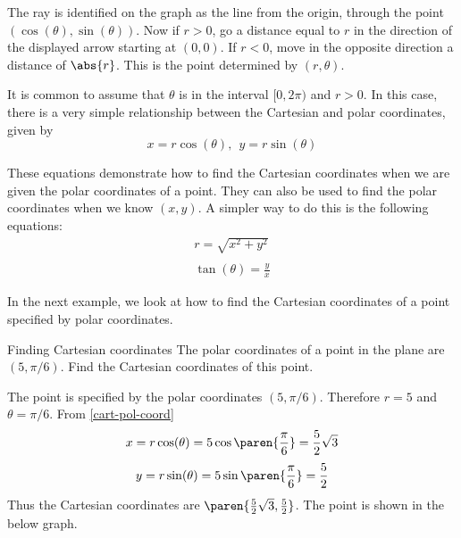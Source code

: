 The ray is identified on the graph as the line from the origin, through the point $(\cos(\theta),\sin(\theta))$. Now if $r>0$, go a distance
equal to $r$ in the direction of the displayed arrow starting at $(0,0)$. If
$r<0$, move in the opposite direction a distance of $\abs{r}
$. This is the point determined by $(r,\theta)$.

It is common to assume that $\theta $ is in the interval $
[0,2\pi )$ and $r>0$. In this case, there is a very simple relationship
between the Cartesian and polar coordinates, given by
\begin{equation}
x=r\cos (\theta) ,\ \ y=r\sin (\theta)
\label{cart-pol-coord}
\end{equation}

These equations demonstrate how to find the Cartesian coordinates when we are given the polar coordinates of a point. They can also be used to find the polar coordinates when we know $(x, y)$. A simpler way to do this is the following equations:
\begin{equation}
\begin{array}{l}
r = \sqrt{x^2 + y^2} \\
\\
\tan (\theta) = \frac{y}{x}
\end{array}
\label{pol-cart-coord}
\end{equation}

In the next example, we look at how to find the Cartesian coordinates of a point specified by polar coordinates.

\begin{example}{Finding Cartesian coordinates}{}
The polar coordinates of a point in the plane are $(5,\pi /6)$.
Find the Cartesian coordinates of this point.
\end{example}

\begin{solution}
The point is specified by the polar coordinates $(5,\pi /6)$. Therefore $r=5$ and $\theta = \pi /6$.
From {\eqref{cart-pol-coord}}
\[
x= r \cos (\theta)= 5\cos \paren{\vspace{0.05in}\frac{\pi }{6}} = \vspace{0.05in}\frac{5}{2}\sqrt{3}
\]
\[
y= r \sin (\theta) = 5\sin \paren{\vspace{0.05in}\frac{\pi }{6}} = \vspace{0.05in}\frac{5}{2}
\]
Thus the Cartesian coordinates are $\paren{\vspace{0.05in}\frac{5}{2}\sqrt{3}, \vspace{0.05in}\frac{5}{2}}$. The point is shown in the below graph.

\begin{center}
\end{center}
\end{solution}

